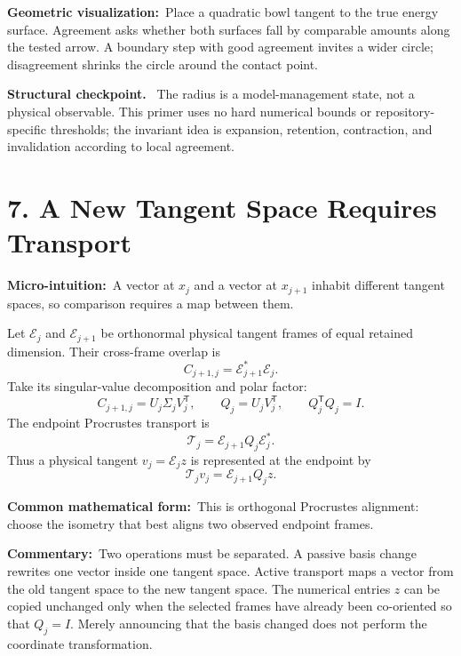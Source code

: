 \documentclass[10pt,twocolumn]{article}
\newcommand{\micro}[1]{\par\noindent\textbf{Micro-intuition:}\ #1\par}
\newcommand{\form}[1]{\par\noindent\textbf{Common mathematical form:}\ #1\par}
\newcommand{\commentary}[1]{\par\noindent\textbf{Commentary:}\ #1\par}
\newcommand{\geom}[1]{\par\noindent\textbf{Geometric visualization:}\ \textcolor{teal!70!black}{#1}\par}
\newcommand{\conceptbreak}{\par\medskip\noindent{\color{black!30}\rule{\columnwidth}{0.35pt}}\par\medskip}
\newenvironment{insight}{\begin{center}\begin{minipage}{0.94\columnwidth}\color{blue!35!black}\textbf{Structural checkpoint.}\ }{\end{minipage}\end{center}}
\begin{document}
\geom{Place a quadratic bowl tangent to the true energy surface. Agreement asks
whether both surfaces fall by comparable amounts along the tested arrow. A
boundary step with good agreement invites a wider circle; disagreement shrinks
the circle around the contact point.}

\begin{insight}
The radius is a model-management state, not a physical observable. This primer
uses no hard numerical bounds or repository-specific thresholds; the invariant
idea is expansion, retention, contraction, and invalidation according to local
agreement.
\end{insight}

\conceptbreak

\section*{7. A New Tangent Space Requires Transport}

\micro{A vector at \(x_j\) and a vector at \(x_{j+1}\) inhabit different
tangent spaces, so comparison requires a map between them.}

Let \(\mathcal E_j\) and \(\mathcal E_{j+1}\) be orthonormal physical tangent
frames of equal retained dimension. Their cross-frame overlap is
\begin{equation}
C_{j+1,j}=\mathcal E_{j+1}^*\mathcal E_j.
\label{eq:cross-frame-overlap}
\end{equation}
Take its singular-value decomposition and polar factor:
\begin{equation}
C_{j+1,j}=U_j\Sigma_jV_j^{\mathsf T},
\qquad
Q_j=U_jV_j^{\mathsf T},
\qquad
Q_j^{\mathsf T}Q_j=I.
\label{eq:procrustes-factor}
\end{equation}
The endpoint Procrustes transport is
\begin{equation}
\mathcal T_j
=\mathcal E_{j+1}Q_j\mathcal E_j^*.
\label{eq:physical-transport}
\end{equation}
Thus a physical tangent \(v_j=\mathcal E_jz\) is represented at the endpoint by
\begin{equation}
\mathcal T_jv_j
=\mathcal E_{j+1}Q_jz.
\label{eq:transported-coordinate}
\end{equation}

\form{This is orthogonal Procrustes alignment: choose the isometry that best
aligns two observed endpoint frames.}

\commentary{Two operations must be separated. A passive basis change rewrites
one vector inside one tangent space. Active transport maps a vector from the
old tangent space to the new tangent space. The numerical entries \(z\) can be
copied unchanged only when the selected frames have already been co-oriented so
that \(Q_j=I\). Merely announcing that the basis changed does not perform the
coordinate transformation.}
\end{document}

